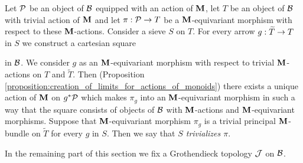 \begin{definition}
Let ${\mathcal P}$ be an object of ${\mathcal B}$ equipped with an action of $\mathbf{M}$, let $T$ be an object of ${\mathcal B}$ with trivial action of $\mathbf{M}$ and let $\pi:{\mathcal P}\rightarrow T$ be a $\mathbf{M}$-equivariant morphism with respect to these $\mathbf{M}$-actions. Consider a sieve $S$ on $T$. For every arrow $g:\widetilde{T}\rightarrow T$ in $S$ we construct a cartesian square
\begin{center}
\end{center}
in ${\mathcal B}$. We consider $g$ as an $\mathbf{M}$-equivariant morphism with respect to trivial $\mathbf{M}$-actions on $T$ and $\widetilde{T}$. Then (Proposition \ref{proposition:creation_of_limits_for_actions_of_monoids}) there exists a unique action of $\mathbf{M}$ on $g^*{\mathcal P}$ which makes $\pi_g$ into an $\mathbf{M}$-equivariant morphism in such a way that the square consists of objects of ${\mathcal B}$ with $\mathbf{M}$-actions and $\mathbf{M}$-equivariant morphisms. Suppose that $\mathbf{M}$-equivariant morphism $\pi_g$ is a trivial principal $\mathbf{M}$-bundle on $\widetilde{T}$ for every $g$ in $S$. Then we say that \textit{$S$ trivializes $\pi$}.
\end{definition}
\noindent
In the remaining part of this section we fix a Grothendieck topology ${\mathcal J}$ on ${\mathcal B}$.

